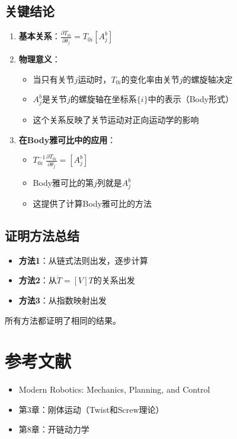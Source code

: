 \documentclass[12pt,a4paper]{article}
\begin{document}
\subsection{关键结论}

\begin{enumerate}
\item \textbf{基本关系}：$\frac{\partial T_{0i}}{\partial \theta_j} = T_{0i} [A_j^b]$

\item \textbf{物理意义}：
\begin{itemize}
\item 当只有关节$j$运动时，$T_{0i}$的变化率由关节$j$的螺旋轴决定
\item $A_j^b$是关节$j$的螺旋轴在坐标系$\{i\}$中的表示（Body形式）
\item 这个关系反映了关节运动对正向运动学的影响
\end{itemize}

\item \textbf{在Body雅可比中的应用}：
\begin{itemize}
\item $T_{0i}^{-1} \frac{\partial T_{0i}}{\partial \theta_j} = [A_j^b]$
\item Body雅可比的第$j$列就是$A_j^b$
\item 这提供了计算Body雅可比的方法
\end{itemize}
\end{enumerate}

\subsection{证明方法总结}

\begin{itemize}
\item \textbf{方法1}：从链式法则出发，逐步计算
\item \textbf{方法2}：从$\dot{T} = [V]T$的关系出发
\item \textbf{方法3}：从指数映射出发
\end{itemize}

所有方法都证明了相同的结果。

\section{参考文献}

\begin{itemize}
\item Modern Robotics: Mechanics, Planning, and Control
\item 第3章：刚体运动（Twist和Screw理论）
\item 第8章：开链动力学
\end{itemize}
\end{document}
